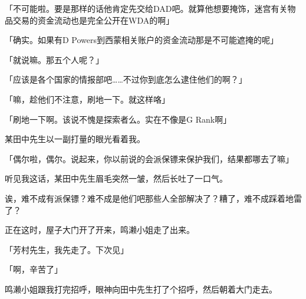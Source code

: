 「不可能啦。要是那样的话他肯定先交给DAD吧。就算他想要掩饰，迷宫有关物品交易的资金流动也是完全公开在WDA的啊」

「确实。如果有D Powers到西蒙相关账户的资金流动那是不可能遮掩的呢」

「就说嘛。那五个人呢？」

「应该是各个国家的情报部吧……不过你到底怎么逮住他们的啊？」

「嘛，趁他们不注意，刷地一下。就这样咯」

「刷地一下啊。该说不愧是探索者么。实在不像是G Rank啊」

某田中先生以一副打量的眼光看着我。

「偶尔啦，偶尔。说起来，你以前说的会派保镖来保护我们，结果都哪去了嘛」

听见我这话，某田中先生眉毛突然一皱，然后长吐了一口气。

诶，难不成有派保镖？难不成是他们吧那些人全部解决了？糟了，难不成踩着地雷了？

正在这时，屋子大门开了开来，鸣濑小姐走了出来。

「芳村先生，我先走了。下次见」

「啊，辛苦了」

鸣濑小姐跟我打完招呼，眼神向田中先生打了个招呼，然后朝着大门走去。

